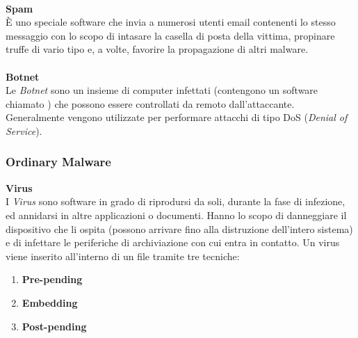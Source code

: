 \\
\textbf{Spam}\\
È uno speciale software che invia a numerosi utenti email contenenti lo stesso messaggio con lo scopo di intasare la casella di posta della vittima, propinare truffe di vario tipo e, a volte, favorire la propagazione di altri malware.\\
\\
\textbf{Botnet}\\
Le \textit{Botnet} sono un insieme di computer infettati (contengono un software chiamato ) che possono essere controllati da remoto dall'attaccante. Generalmente vengono utilizzate per performare attacchi di tipo DoS (\textit{Denial of Service}).

\pagebreak

\subsubsection{Ordinary Malware}

\textbf{Virus}\\
I \textit{Virus} sono software in grado di riprodursi da soli, durante la fase di infezione, ed annidarsi in altre applicazioni o documenti. Hanno lo scopo di danneggiare il dispositivo che li ospita (possono arrivare fino alla distruzione dell'intero sistema) e di infettare le periferiche di archiviazione con cui entra in contatto. Un virus viene inserito all'interno di un file tramite tre tecniche:

\begin{enumerate}
    \item \textbf{Pre-pending}
    \item \textbf{Embedding}
    \item \textbf{Post-pending}
\end{enumerate}

